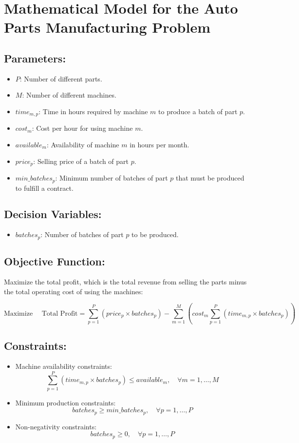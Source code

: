 \documentclass{article}
\begin{document}
\section*{Mathematical Model for the Auto Parts Manufacturing Problem}

\subsection*{Parameters:}

\begin{itemize}
    \item $P$: Number of different parts.
    \item $M$: Number of different machines.
    \item $time_{m,p}$: Time in hours required by machine $m$ to produce a batch of part $p$.
    \item $cost_{m}$: Cost per hour for using machine $m$.
    \item $available_{m}$: Availability of machine $m$ in hours per month.
    \item $price_{p}$: Selling price of a batch of part $p$.
    \item $min\_batches_{p}$: Minimum number of batches of part $p$ that must be produced to fulfill a contract.
\end{itemize}

\subsection*{Decision Variables:}

\begin{itemize}
    \item $batches_{p}$: Number of batches of part $p$ to be produced.
\end{itemize}

\subsection*{Objective Function:}

Maximize the total profit, which is the total revenue from selling the parts minus the total operating cost of using the machines:

\[
\text{Maximize } \quad \text{Total Profit} = \sum_{p=1}^{P} (price_{p} \times batches_{p}) - \sum_{m=1}^{M} \left(cost_{m} \sum_{p=1}^{P} (time_{m,p} \times batches_{p})\right)
\]

\subsection*{Constraints:}

\begin{itemize}
    \item Machine availability constraints:
    \[
    \sum_{p=1}^{P} (time_{m,p} \times batches_{p}) \leq available_{m}, \quad \forall m = 1, \ldots, M
    \]
    \item Minimum production constraints:
    \[
    batches_{p} \geq min\_batches_{p}, \quad \forall p = 1, \ldots, P
    \]
    \item Non-negativity constraints:
    \[
    batches_{p} \geq 0, \quad \forall p = 1, \ldots, P
    \]
\end{itemize}
\end{document}

